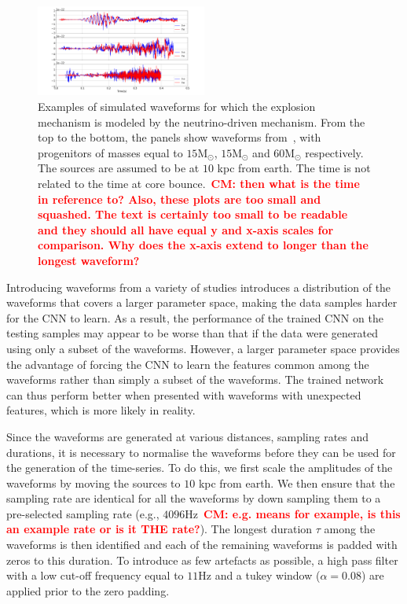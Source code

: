 \documentclass[aps,twocolumn,showpacs,groupedaddress, nofootinbib]{revtex4}  %
\newcommand{\cm}[1]{\textbf{\textcolor{red}{CM: #1}}}
\begin{document}
%
%
\begin{figure}
\includegraphics[width=0.5\textwidth]{neu_waveforms.png}
\caption{Examples of simulated waveforms for which the explosion mechanism is
modeled by the neutrino-driven mechanism. From the top to the bottom, the
panels show waveforms from~\cite{10.1093mnrasstz990, murphy2009model,
radice2019characterizing}, with progenitors of masses equal to
$15\text{M}_\odot$, $15\text{M}_\odot$ and $60\text{M}_\odot$ respectively.
The sources are assumed to be at $10$ kpc from earth. The time is not related
to the time at core bounce.~\cm{then what is the time in reference to? Also, these
plots are too small and squashed. The text is certainly too small to be
readable and they should all have equal y and x-axis scales for comparison. Why
does the x-axis extend to longer than the longest waveform?}
\label{fig:neuwaveforms}}
\end{figure}

%
%
Introducing waveforms from a variety of studies introduces a distribution of
the waveforms that covers a larger parameter space, making the data samples
harder for the \ac{CNN} to learn. As a result, the performance of the trained
\ac{CNN} on the testing samples may appear to be worse than that if the data
were generated using only a subset of the waveforms. However, a larger
parameter space provides the advantage of forcing the \ac{CNN} to learn the
features common among the waveforms rather than simply a subset of the
waveforms.  The trained network can thus perform better when presented with
waveforms with unexpected features, which is more likely in reality.

%
%
Since the waveforms are generated at various distances, sampling rates and
durations, it is necessary to normalise the waveforms before they can be used
for the generation of the time-series. To do this, we first scale the
amplitudes of the waveforms by moving the sources to $10$ kpc from earth. We
then ensure that the sampling rate are identical for all the waveforms by down
sampling them to a pre-selected sampling rate (e.g., $4096$Hz~\cm{e.g. means
for example, is this an example rate or is it THE rate?}). The longest duration
$\tau$ among the waveforms is then identified and each of the remaining
waveforms is padded with zeros to this duration. To introduce as few artefacts
as possible, a high pass filter with a low cut-off frequency equal to $11$Hz
and a tukey window ($\alpha = 0.08$) are applied prior to the zero padding. 
\end{document}

